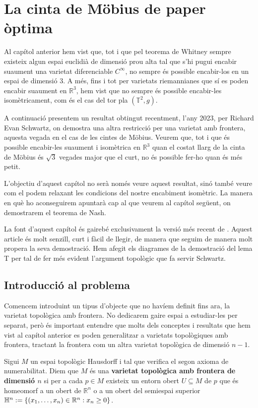 \chapter{La cinta de Möbius de paper òptima}

Al capítol anterior hem vist que, tot i que pel teorema de Whitney sempre existeix algun espai euclidià de dimensió prou alta tal que s'hi pugui encabir suaument una varietat diferenciable $C^\infty$, no sempre és possible encabir-los en un espai de dimensió 3. A més, fins i tot per varietats riemannianes que sí es poden encabir suaument en $\mathbb R^3$, hem vist que no sempre és possible encabir-les isomètricament, com és el cas del tor pla $(\mathbb T^2, g)$. 

A continuació presentem un resultat obtingut recentment, l'any 2023, per Richard Evan Schwartz, on demostra una altra restricció per una varietat amb frontera, aquesta vegada en el cas de les cintes de Möbius. Veurem que, tot i que és possible encabir-les suaument i isomètrica en $\mathbb R^3$ quan el costat llarg de la cinta de Möbius és $\sqrt3$ vegades major que el curt, no és possible fer-ho quan és més petit. 

L'objectiu d'aquest capítol no serà només veure aquest resultat, sinó també veure com el podem  relaxant les condicions del nostre encabiment isomètric. La manera en què ho aconseguirem apuntarà cap al que veurem al capítol següent, on demostrarem el teorema de Nash. 

La font d'aquest capítol és gairebé exclusivament la versió més recent de \citet{schwartz2024}. Aquest article és molt senzill, curt i fàcil de llegir, de manera que seguim de manera molt propera la seva demostració. Hem afegit els diagrames de la demostració del lema T per tal de fer més evident l'argument topològic que fa servir Schwartz.


\section{Introducció al problema}
Comencem introduint un tipus d'objecte que no havíem definit fins ara, la varietat topològica amb frontera. No dedicarem gaire espai a estudiar-les per separat, però és important entendre que molts dels conceptes i resultats que hem vist al capítol anterior es poden generalitzar a varietats topològiques amb frontera, tractant la frontera com un altra varietat topològica de dimensió $n-1$.
\begin{defi}\label{def:varietat_topologica_amb_frontera}
    Sigui $M$ un espai topològic Hausdorff i tal que verifica el segon axioma de numerabilitat. Diem que $M$ és una \textbf{varietat topològica amb frontera de dimensió $n$} si per a cada $p\in M$ existeix un entorn obert $U\subseteq M$ de $p$ que és homeomorf a un obert de $\mathbb R^n$ o a un obert del semiespai superior $\mathbb H^n := \{(x_1, \dots, x_n)\in\mathbb R^n:x_n\geq 0\}$. 
\end{defi}

